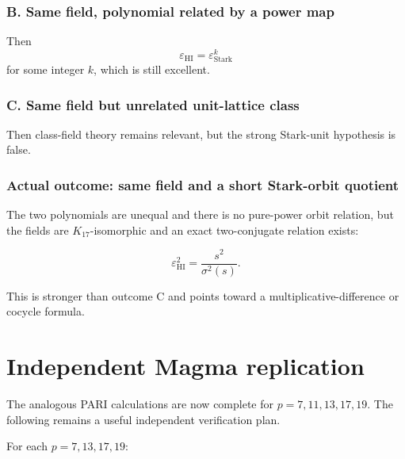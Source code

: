\documentclass[11pt,reqno]{amsart}
\theoremstyle{plain}
\begin{document}
\subsubsection*{B. Same field, polynomial related by a power map}

Then
\[
\varepsilon_{\mathrm{HI}}
=
\varepsilon_{\mathrm{Stark}}^k
\]
for some integer \(k\), which is still excellent.

\subsubsection*{C. Same field but unrelated unit-lattice class}

Then class-field theory remains relevant, but the strong Stark-unit hypothesis is false.

\subsubsection*{Actual outcome: same field and a short Stark-orbit quotient}

The two polynomials are unequal and there is no pure-power orbit relation, but the fields are \(K_{17}\)-isomorphic and an exact two-conjugate relation exists:

\[
\varepsilon_{\mathrm{HI}}^2
=
\frac{s^2}{\sigma^2(s)}.
\]

This is stronger than outcome C and points toward a multiplicative-difference or cocycle formula.

\section{Independent Magma replication}\label{sec:13}

The analogous PARI calculations are now complete for \(p=7,11,13,17,19\). The following remains a useful independent verification plan.

For each \(p=7,13,17,19\):
\end{document}
